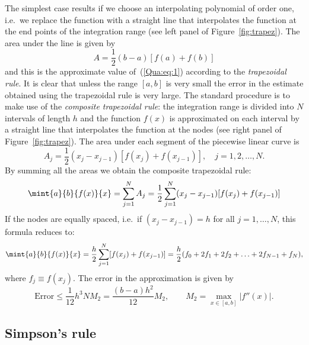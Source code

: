 The simplest case results if we choose an interpolating polynomial of
order one, i.e.\ we replace the function with a straight line that
interpolates the function at the end points of the integration range
(see left panel of Figure~\ref{fig:trapez}).   The area under the line
is given by
%
\begin{equation}
  A = \frac{1}{2} (b-a) [f(a) + f(b)]
  \label{Qua:eq:32}
\end{equation}
%
and this is the approximate value of~(\ref{Qua:eq:1}) according to the
\textit{trapezoidal rule}.  It is clear that unless the range $[a,b]$
is very small the error in the estimate obtained using the trapezoidal
rule is very large.  The standard procedure is to make use of the
\textit{composite trapezoidal rule}: the integration range is divided
into $N$ intervals of length $h$ and the function $f(x)$ is
approximated on each interval by a straight line that interpolates the
function at the nodes (see right panel of Figure~\ref{fig:trapez}).
The area under each segment of the piecewise linear curve is
%
\begin{equation}
  A_j = \frac{1}{2} (x_{j}-x_{j-1}) [f(x_{j})+f(x_{j-1})] , \quad
  j = 1,2, \ldots, N.
  \label{Qua:eq:4}
\end{equation}
%
By summing all the areas we obtain the composite trapezoidal rule:
%
\begin{equation}
  \mint{a}{b}{f(x)}{x} = \sum_{j=1}^{N} A_j =
  \frac{1}{2} \sum_{j=1}^{N} (x_{j}-x_{j-1}) [f(x_{j})+f(x_{j-1})]
  \label{Qua:eq:5}
\end{equation}
%
If the nodes are equally spaced, i.e.\ if $(x_{j}-x_{j-1}) = h$ for all
$j=1, \ldots, N$, this formula reduces to:
%
\begin{equation}
 \mint{a}{b}{f(x)}{x} =
  \frac{h}{2} \sum_{j=1}^{N} [f(x_{j})+f(x_{j-1})] =
  \frac{h}{2} ( f_0 + 2 f_1 + 2 f_2 + \ldots + 2 f_{N-1} + f_N ) ,
\label{Qua:eq:12}
\end{equation}
%
where $f_j \equiv f(x_j)$.  The error in the approximation is given by
%
\begin{equation}
  \text{Error} \le \frac{1}{12} h^3 N M_2 =
  \frac{(b-a) h^2}{12} M_2 , \qquad
  M_2 = \max_{x\in[a,b]} |f''(x)| .
  \label{Qua:eq:6}
\end{equation}

\subsection{Simpson's rule}

